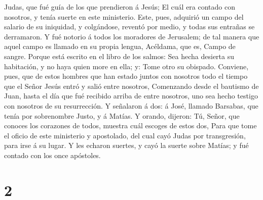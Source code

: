 Judas, que fué guía de los que prendieron á Jesús;  El
cuál era contado con nosotros, y tenía suerte en este ministerio.
 Este, pues, adquirió un campo del salario de su
iniquidad, y colgándose, reventó por medio, y todas sus entrañas se
derramaron.  Y fué notorio á todos los moradores de
Jerusalem; de tal manera que aquel campo es llamado en su propia lengua,
Acéldama, que es, Campo de sangre.  Porque está escrito
en el libro de los salmos: Sea hecha desierta su habitación, y no haya
quien more en ella; y: Tome otro su obispado.  Conviene,
pues, que de estos hombres que han estado juntos con nosotros todo el
tiempo que el Señor Jesús entró y salió entre nosotros, 
Comenzando desde el bautismo de Juan, hasta el día que fué recibido
arriba de entre nosotros, uno sea hecho testigo con nosotros de su
resurrección.  Y señalaron á dos: á José, llamado
Barsabas, que tenía por sobrenombre Justo, y á Matías.  Y
orando, dijeron: Tú, Señor, que conoces los corazones de todos, muestra
cuál escoges de estos dos,  Para que tome el oficio de
este ministerio y apostolado, del cual cayó Judas por transgresión, para
irse á su lugar.  Y les echaron suertes, y cayó la suerte
sobre Matías; y fué contado con los once apóstoles.

\hypertarget{section-1}{%
\section{2}\label{section-1}}

